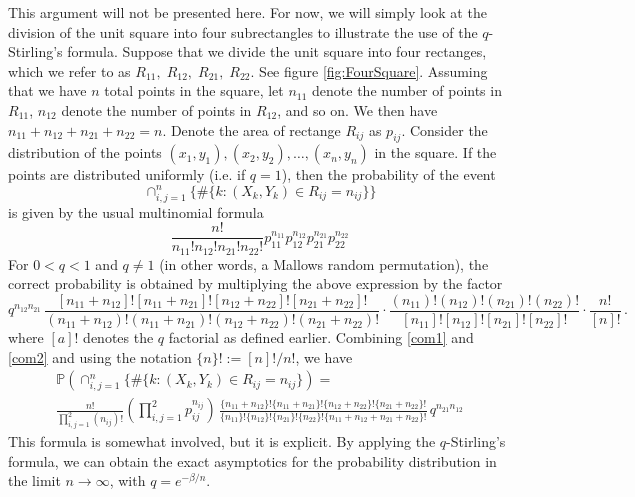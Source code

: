 \documentclass[12pt]{report}
\theoremstyle{definition}
\begin{document}
This argument will not be presented here.  For now, we will simply look at the division of the unit square into four subrectangles to illustrate the use of the $q$-Stirling's formula.  Suppose that we divide the unit square into four rectanges, which we refer to as $R_{11}, \; R_{12},\; R_{21},\;  R_{22}$.  See figure \ref{fig:FourSquare}.  Assuming that we have $n$ total points in the square, let $n_{11}$ denote the number of points in $R_{11}$, $n_{12}$ denote the number of points in $R_{12}$, and so on.  We then have $n_{11}+n_{12}+n_{21}+n_{22}=n$.  Denote the area of rectange $R_{ij}$ as $p_{ij}$.  Consider the distribution of the points $(x_1,y_1), (x_2,y_2),\dots, (x_n, y_n)$ in the square.  If the points are distributed uniformly (i.e. if $q=1$), then the probability of the event
$$
\cap_{i,j=1}^n \{\# \{k:(X_k,Y_k)\in R_{ij}=n_{ij}\}\}
$$
is given by the usual multinomial formula 
\begin{equation}
\label{com1}
\frac{n!}{n_{11}!n_{12}!n_{21}!n_{22}!} p_{11}^{n_{11}}p_{12}^{n_{12}}p_{21}^{n_{21}}p_{22}^{n_{22}}
\end{equation}
For $0<q<1$ and $q\not = 1$ (in other words, a Mallows random permutation), the correct probability is obtained by multiplying the above expression by the factor 
\begin{equation}
\label{com2}
q^{n_{12} n_{21}}\,
\frac{[n_{11}+n_{12}]![n_{11}+n_{21}]![n_{12}+n_{22}]![n_{21}+n_{22}]!}
{(n_{11}+n_{12})!(n_{11}+n_{21})!(n_{12}+n_{22})!(n_{21}+n_{22})!}
\cdot \frac{(n_{11})!(n_{12})!(n_{21})!(n_{22})!}{[n_{11}]![n_{12}]![n_{21}]![n_{22}]!}
\cdot \frac{n!}{[n]!}\, .
\end{equation}
where $[a]!$ denotes the $q$ factorial as defined earlier.  Combining \ref{com1} and \ref{com2} and using the notation $\{n\}!:=[n]!/n!$, we have
\begin{multline}
\label{4square}
\mathbb{P}\left(\cap_{i,j=1}^n \{\# \{k:(X_k,Y_k)\in R_{ij}=n_{ij}\}\right)= \\
\frac{n!}{\prod_{i,j=1}^2 (n_{ij})!}\left(\prod_{i,j=1}^2 p_{ij}^{n_{ij}}\right) \, 
\frac{\{n_{11}+n_{12}\}!\{n_{11}+n_{21}\}!\{n_{12}+n_{22}\}!\{n_{21}+n_{22}\}!}
{\{n_{11}\}!\{n_{12}\}!\{n_{21}\}!\{n_{22}\}!\{n_{11}+n_{12}+n_{21}+n_{22}\}!}\,q^{n_{21}n_{12}} 
\end{multline}
This formula is somewhat involved, but it is explicit.  By applying the $q$-Stirling's formula, we can obtain the exact asymptotics for the probability distribution in the limit $n\rightarrow\infty$, with $q=e^{-\beta/n}$.  
\end{document}
